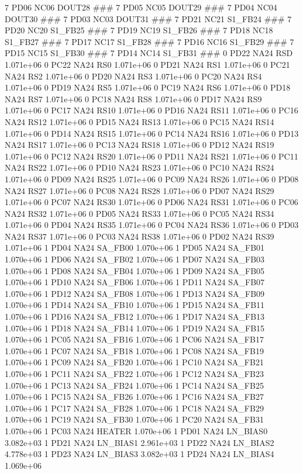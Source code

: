 7 PD06 NC06 DOUT28 ### 
7 PD05 NC05 DOUT29 ### 
7 PD04 NC04 DOUT30 ### 
7 PD03 NC03 DOUT31 ### 
7 PD21 NC21 S1_FB24 ### 
7 PD20 NC20 S1_FB25 ### 
7 PD19 NC19 S1_FB26 ### 
7 PD18 NC18 S1_FB27 ### 
7 PD17 NC17 S1_FB28 ### 
7 PD16 NC16 S1_FB29 ### 
7 PD15 NC15 S1_FB30 ### 
7 PD14 NC14 S1_FB31 ### 
0 PD22 NA24 RSD 1.071e+06 
0 PC22 NA24 RS0 1.071e+06 
0 PD21 NA24 RS1 1.071e+06 
0 PC21 NA24 RS2 1.071e+06 
0 PD20 NA24 RS3 1.071e+06 
0 PC20 NA24 RS4 1.071e+06 
0 PD19 NA24 RS5 1.071e+06 
0 PC19 NA24 RS6 1.071e+06 
0 PD18 NA24 RS7 1.071e+06 
0 PC18 NA24 RS8 1.071e+06 
0 PD17 NA24 RS9 1.071e+06 
0 PC17 NA24 RS10 1.071e+06 
0 PD16 NA24 RS11 1.071e+06 
0 PC16 NA24 RS12 1.071e+06 
0 PD15 NA24 RS13 1.071e+06 
0 PC15 NA24 RS14 1.071e+06 
0 PD14 NA24 RS15 1.071e+06 
0 PC14 NA24 RS16 1.071e+06 
0 PD13 NA24 RS17 1.071e+06 
0 PC13 NA24 RS18 1.071e+06 
0 PD12 NA24 RS19 1.071e+06 
0 PC12 NA24 RS20 1.071e+06 
0 PD11 NA24 RS21 1.071e+06 
0 PC11 NA24 RS22 1.071e+06 
0 PD10 NA24 RS23 1.071e+06 
0 PC10 NA24 RS24 1.071e+06 
0 PD09 NA24 RS25 1.071e+06 
0 PC09 NA24 RS26 1.071e+06 
0 PD08 NA24 RS27 1.071e+06 
0 PC08 NA24 RS28 1.071e+06 
0 PD07 NA24 RS29 1.071e+06 
0 PC07 NA24 RS30 1.071e+06 
0 PD06 NA24 RS31 1.071e+06 
0 PC06 NA24 RS32 1.071e+06 
0 PD05 NA24 RS33 1.071e+06 
0 PC05 NA24 RS34 1.071e+06 
0 PD04 NA24 RS35 1.071e+06 
0 PC04 NA24 RS36 1.071e+06 
0 PD03 NA24 RS37 1.071e+06 
0 PC03 NA24 RS38 1.071e+06 
0 PD02 NA24 RS39 1.071e+06 
1 PD04 NA24 SA_FB00 1.070e+06 
1 PD05 NA24 SA_FB01 1.070e+06 
1 PD06 NA24 SA_FB02 1.070e+06 
1 PD07 NA24 SA_FB03 1.070e+06 
1 PD08 NA24 SA_FB04 1.070e+06 
1 PD09 NA24 SA_FB05 1.070e+06 
1 PD10 NA24 SA_FB06 1.070e+06 
1 PD11 NA24 SA_FB07 1.070e+06 
1 PD12 NA24 SA_FB08 1.070e+06 
1 PD13 NA24 SA_FB09 1.070e+06 
1 PD14 NA24 SA_FB10 1.070e+06 
1 PD15 NA24 SA_FB11 1.070e+06 
1 PD16 NA24 SA_FB12 1.070e+06 
1 PD17 NA24 SA_FB13 1.070e+06 
1 PD18 NA24 SA_FB14 1.070e+06 
1 PD19 NA24 SA_FB15 1.070e+06 
1 PC05 NA24 SA_FB16 1.070e+06 
1 PC06 NA24 SA_FB17 1.070e+06 
1 PC07 NA24 SA_FB18 1.070e+06 
1 PC08 NA24 SA_FB19 1.070e+06 
1 PC09 NA24 SA_FB20 1.070e+06 
1 PC10 NA24 SA_FB21 1.070e+06 
1 PC11 NA24 SA_FB22 1.070e+06 
1 PC12 NA24 SA_FB23 1.070e+06 
1 PC13 NA24 SA_FB24 1.070e+06 
1 PC14 NA24 SA_FB25 1.070e+06 
1 PC15 NA24 SA_FB26 1.070e+06 
1 PC16 NA24 SA_FB27 1.070e+06 
1 PC17 NA24 SA_FB28 1.070e+06 
1 PC18 NA24 SA_FB29 1.070e+06 
1 PC19 NA24 SA_FB30 1.070e+06 
1 PC20 NA24 SA_FB31 1.070e+06 
1 PC03 NA24 HEATER 1.070e+06 
1 PD01 NA24 LN_BIAS0 3.082e+03 
1 PD21 NA24 LN_BIAS1 2.961e+03 
1 PD22 NA24 LN_BIAS2 4.778e+03 
1 PD23 NA24 LN_BIAS3 3.082e+03 
1 PD24 NA24 LN_BIAS4 1.069e+06 
